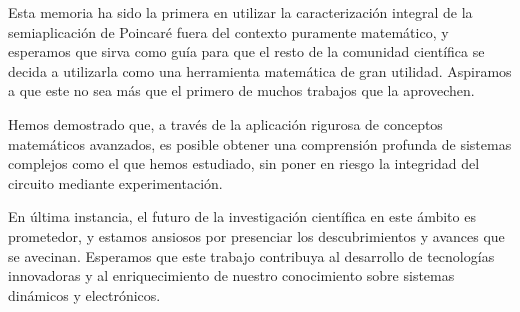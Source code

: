 \documentclass[12pt,a4paper]{report} %
\begin{document}
	\vspace{0.5cm} Esta memoria ha sido la primera en utilizar la caracterización integral de la semiaplicación de Poincaré fuera del contexto puramente matemático, y esperamos que sirva como guía para que el resto de la comunidad científica se decida a utilizarla como una herramienta matemática de gran utilidad. Aspiramos a que este no sea más que el primero de muchos trabajos que la aprovechen.
	
	\vspace{0.5cm} Hemos demostrado que, a través de la aplicación rigurosa de conceptos matemáticos avanzados, es posible obtener una comprensión profunda de sistemas complejos como el que hemos estudiado, sin poner en riesgo la integridad del circuito mediante experimentación.
	
	\vspace{0.5cm} En última instancia, el futuro de la investigación científica en este ámbito es prometedor, y estamos ansiosos por presenciar los descubrimientos y avances que se avecinan. Esperamos que este trabajo contribuya al desarrollo de tecnologías innovadoras y al enriquecimiento de nuestro conocimiento sobre sistemas dinámicos y electrónicos.
	
	
	\newpage
	
\end{document}
